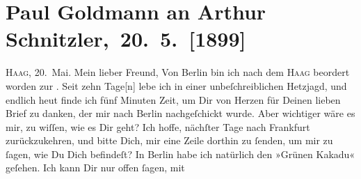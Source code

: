 

         
         \renewcommand{\erwaehntePersonen}{Personen: Alfred Kerr, Theodore Rottenberg}
         \renewcommand{\erwaehnteOrte}{Orte: Berlin, Den Haag, Frankfurt am Main, Frankreich, Wien}
         \renewcommand{\erwaehnteWerke}{Werke: Der grüne Kakadu. Groteske in einem Akt}
               \section[ Paul Goldmann an Arthur Schnitzler, 20. 5. {[}1899{]}]{ Paul Goldmann an Arthur Schnitzler, 20. 5. {[}1899{]}}\nopagebreak{}\rehead{ }\begin{ledgroupsized}[t]{13cm}\normalsize\beginnumbering \toendnotes[C]{\smallbreak\pagebreak[2]} 
\toendnotes[C]{\smallbreak}\pstart
           \raggedleft{}{\pb}\textsc{Haag}, 20. Mai.\pend
           \pstart{}Mein lieber Freund,\pend\pstart
           Von Berlin bin ich nach dem \textsc{Haag} beordert worden zur \label{K_L02875-1v}\label{K_L02875-1h}. Seit zehn Tage{[}n{]} lebe
               ich in einer unbeſchreiblichen Hetzjagd, und endlich heut finde ich fünf Minuten Zeit, um Dir von Herzen für Deinen lieben
               Brief zu danken, der mir nach Berlin
               nachgeſchickt wurde. Aber wichtiger wäre es mir, zu wiſſen, wie es Dir geht? Ich
               hoffe, nächſter Tage nach Frankfurt
               zurückzukehren, und bitte Dich, mir  eine Zeile
               dorthin zu ſenden, um mir zu ſagen, {\pb}wie Du Dich
               befindeſt?\pend
           \pstart
           In Berlin habe ich natürlich den »Grünen Kakadu« geſehen. Ich kann Dir nur offen ſagen, mit

\end{ledgroupsized}
